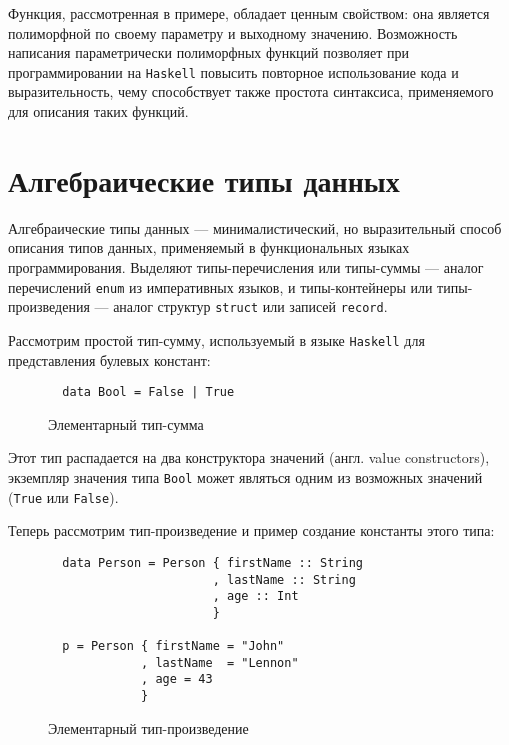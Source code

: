   Функция, рассмотренная в примере, обладает ценным свойством: она является
  полиморфной по своему параметру и выходному значению. Возможность написания
  параметрически полиморфных функций позволяет при программировании на
  \lstinline{Haskell} повысить повторное использование кода и выразительность,
  чему способствует также простота синтаксиса, применяемого для описания таких
  функций.

\section{Алгебраические типы данных}

  Алгебраические типы данных --- минималистический, но выразительный способ
  описания типов данных, применяемый в функциональных языках программирования.
  Выделяют типы-перечисления или типы-суммы --- аналог перечислений
  \lstinline{enum} из императивных языков, и типы-контейнеры или типы-произведения
   --- аналог структур \lstinline{struct} или записей \lstinline{record}.


  Рассмотрим простой тип-сумму, используемый в языке \lstinline{Haskell} для
  представления булевых констант:

  \begin{figure}[h]
  \begin{lstlisting}
  data Bool = False | True
  \end{lstlisting}
  \caption{Элементарный тип-сумма}
  \label{listing:Bool}
  \end{figure}

  Этот тип распадается на два конструктора значений (англ. value constructors),
  экземпляр значения типа \lstinline{Bool} может являться одним из возможных
  значений (\lstinline{True} или \lstinline{False}).

  Теперь рассмотрим тип-произведение и пример создание константы этого типа:

  \begin{figure}[h]
  \begin{lstlisting}
  data Person = Person { firstName :: String
                       , lastName :: String
                       , age :: Int
                       }

  p = Person { firstName = "John"
             , lastName  = "Lennon"
             , age = 43
             }
  \end{lstlisting}
  \caption{Элементарный тип-произведение}
  \label{listing:Bool}
  \end{figure}

